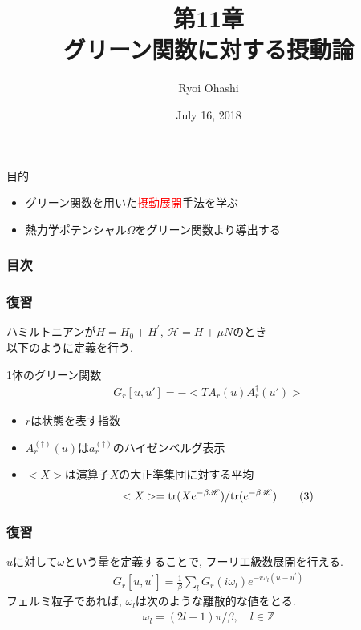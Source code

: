 \documentclass[dvipdfmx,10pt]{beamer}
\title{第11章\\グリーン関数に対する摂動論}
\author{Ryoi Ohashi}
\date{July 16, 2018}
\institute{Department of Applied Physics, Nagoya University}
\begin{document}
\begin{frame}[plain]
    \maketitle
\end{frame}

\begin{frame}{目的}
    \begin{itemize}
        \item グリーン関数を用いた\textcolor{red}{摂動展開}手法を学ぶ
        \item 熱力学ポテンシャル$\Omega$をグリーン関数より導出する
    \end{itemize}
\end{frame}

\begin{frame}\frametitle{目次}
    \setcounter{tocdepth}{1}
    \tableofcontents
\end{frame}

\begin{frame}\frametitle{復習}
    ハミルトニアンが$H=H_0+H^{'}$, $\mathscr{H}=H+\mu N$のとき\\
    以下のように定義を行う.
    \begin{block}{1体のグリーン関数}
        \begin{align}
            G_r[u,u'] = -<TA_r(u)A_r^{\dagger}(u')> \tag{1}
        \end{align}
    \end{block}
    \begin{itemize}
        \item $r$は状態を表す指数\\
        \item $A_r^{(\dagger)}(u)$は$a_r^{(\dagger)}$のハイゼンベルグ表示\\
        \item $<X>$は演算子$X$の大正準集団に対する平均
        \begin{align}
            <X>={\rm tr}(X e^{-\beta\mathscr{H}})/{\rm tr}(e^{-\beta\mathscr{H}}) \tag{3}
        \end{align}
        
    \end{itemize}
\end{frame}

\begin{frame}\frametitle{復習}
    $u$に対して$\omega$という量を定義することで, フーリエ級数展開を行える.
    \begin{align}
        G_r[u,u^{'}] = \frac{1}{\beta}\sum_lG_r(i\omega_l)e^{-i\omega_l(u-u^{'})}
    \end{align}
    フェルミ粒子であれば, $\omega_l$は次のような離散的な値をとる.
    \begin{align}
        \omega_l = (2l+1)\pi/\beta,\quad l\in \mathbb{Z}
    \end{align}
\end{frame}
\end{document}
